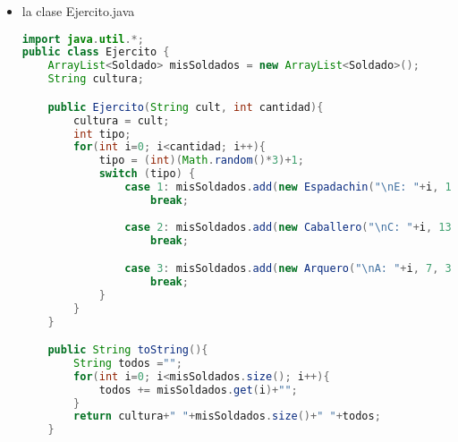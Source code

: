 \documentclass{article}
\begin{document}
\begin{itemize}
\begin{itemize}
\begin{lstlisting}[language=java]
	// Otros métodos
    public void atacar() {
        actitud = "ataque";
        avanzar();
    }

    public void defender() {
        actitud = "defensa";
        velocidad = 0;
    }

    public void avanzar() {
        velocidad++;
    }

    public void retroceder() {
        velocidad--;
    }

    public void serAtacado() {
        vidaActual--;
        if (vidaActual == 0) 
            morir();
    }

    public void huir(){
        actitud = "fuga";
        velocidad++;
    }

    public void morir() {
        vive = false;
    }

    public String toString() {
        return nombre+ " " +nivelAtaque+ " "+nivelDefensa+ " " +nivelVida+ " " +vidaActual+ " " +velocidad+ " " +actitud+ " " +vive;
    }

    public static int cuantos(){
        return num;
    }

    public static void resetearCantidad(){
        num=0;
    }

    public int getVida(){
        return nivelVida;
    }
}
        \end{lstlisting}

                \item la clase Ejercito.java
        \begin{lstlisting}[language=java]
import java.util.*;
public class Ejercito {
    ArrayList<Soldado> misSoldados = new ArrayList<Soldado>();
    String cultura;

    public Ejercito(String cult, int cantidad){
        cultura = cult;
        int tipo;
        for(int i=0; i<cantidad; i++){
            tipo = (int)(Math.random()*3)+1;
            switch (tipo) {
                case 1: misSoldados.add(new Espadachin("\nE: "+i, 10, 8, 10, 40));
                    break;
            
                case 2: misSoldados.add(new Caballero("\nC: "+i, 13, 7, 12));
                    break;

                case 3: misSoldados.add(new Arquero("\nA: "+i, 7, 3, 7, 20));
                    break;
            }
        }
    }

    public String toString(){
        String todos ="";
        for(int i=0; i<misSoldados.size(); i++){
            todos += misSoldados.get(i)+"";
        }
        return cultura+" "+misSoldados.size()+" "+todos;
    }


\end{lstlisting}
\end{itemize}
\end{itemize}
\end{document}
